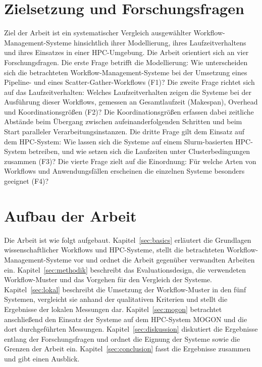 \section{Zielsetzung und Forschungsfragen}
\label{sec:intro:goal}
Ziel der Arbeit ist ein systematischer Vergleich ausgewählter
Workflow-Management-Systeme hinsichtlich ihrer Modellierung,
ihres Laufzeitverhaltens und ihres Einsatzes in einer
HPC-Umgebung. Die Arbeit orientiert sich an vier
Forschungsfragen. Die erste Frage betrifft die Modellierung:
Wie unterscheiden sich die betrachteten
Workflow-Management-Systeme bei der Umsetzung eines Pipeline- und
eines Scatter-Gather-Workflows (F1)? Die zweite Frage richtet sich
auf das Laufzeitverhalten: Welches Laufzeitverhalten zeigen die Systeme
bei der Ausführung dieser Workflows, gemessen an Gesamtlaufzeit (Makespan), Overhead und Koordinationsgrößen (F2)? Die Koordinationsgrößen erfassen dabei
zeitliche Abstände beim Übergang zwischen aufeinanderfolgenden
Schritten und beim Start paralleler Verarbeitungsinstanzen. Die
dritte Frage gilt dem Einsatz auf dem HPC-System: Wie lassen sich
die Systeme auf einem Slurm-basierten HPC-System betreiben, und
wie setzen sich die Laufzeiten unter Clusterbedingungen zusammen
(F3)? Die vierte Frage zielt auf die Einordnung: Für welche Arten
von Workflows und Anwendungsfällen erscheinen die einzelnen
Systeme besonders geeignet (F4)?

\section{Aufbau der Arbeit}
\label{sec:intro:structure}
Die Arbeit ist wie folgt aufgebaut.
Kapitel~\ref{sec:basics} erläutert die Grundlagen wissenschaftlicher
Workflows und HPC-Systeme, stellt die betrachteten
Workflow-Management-Systeme vor und ordnet die Arbeit gegenüber
verwandten Arbeiten ein. Kapitel~\ref{sec:methodik} beschreibt das
Evaluationsdesign, die verwendeten Workflow-Muster und das Vorgehen
für den Vergleich der Systeme. Kapitel~\ref{sec:lokal} beschreibt die Umsetzung der Workflow-Muster in den fünf Systemen, vergleicht sie anhand der qualitativen Kriterien und stellt die Ergebnisse der lokalen Messungen dar.
Kapitel~\ref{sec:mogon} betrachtet anschließend den Einsatz der
Systeme auf dem HPC-System MOGON und die dort durchgeführten
Messungen. Kapitel~\ref{sec:diskussion} diskutiert die Ergebnisse
entlang der Forschungsfragen und ordnet die Eignung der Systeme
sowie die Grenzen der Arbeit ein. Kapitel~\ref{sec:conclusion}
fasst die Ergebnisse zusammen und gibt einen Ausblick.

